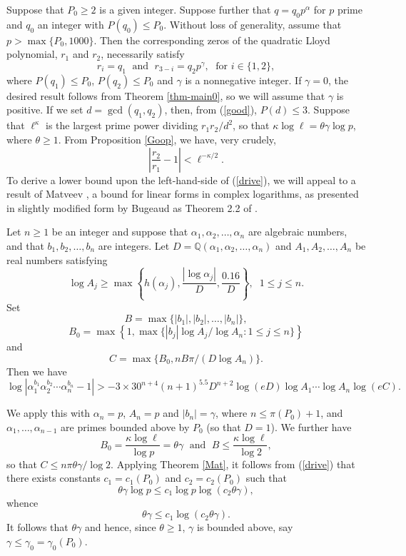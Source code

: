\documentclass{amsart}
\begin{document}
{Suppose that $P_0 \geq 2$ is a given  integer.  Suppose further  that $q=q_0p^\alpha$ for $p$ prime and $q_0$ an integer with $P(q_0) \leq P_0$. Without loss of generality, assume that $p > \max \{ P_0, 1000 \}$. Then the corresponding zeros of the quadratic Lloyd polynomial, $r_1$ and $r_2$, necessarily satisfy
$$
r_i = q_1 \; \mbox{ and } \; r_{3-i} = q_2 p^\gamma, \; \mbox{ for } i \in \{ 1, 2 \},
$$
where $P(q_1) \leq P_0$, $P(q_2) \leq P_0$ and $\gamma$ is a nonnegative integer. If $\gamma=0$, the desired result follows from Theorem \ref{thm-main0}, so  we will assume that $\gamma$ is positive. If we set $d=\gcd (q_1, q_2)$, then, from (\ref{good}), $P(d) \leq 3$.
Suppose that $\ell^\kappa$ is the largest prime power dividing $r_1r_2/d^2$, so that $\kappa \log\ell = \theta \gamma \log p$, where $\theta \geq 1$. From Proposition \ref{Goop}, we have, very crudely,
\begin{equation} \label{drive}
\left| \frac{r_2}{r_{1}} -1 \right|  < \ell^{-\kappa/2}.
\end{equation}
To derive a lower bound upon the left-hand-side of (\ref{drive}), we will appeal to a result of Matveev \cite{Mat}, a bound for linear forms in complex logarithms, as presented in slightly modified form by Bugeaud as Theorem 2.2 of \cite{Bug}.
\begin{thm}[Matveev] \label{Mat} Let $n \geq 1$ be an integer and
suppose that $\alpha_1, \alpha_2, \ldots, \alpha_n$ are algebraic numbers, and that $b_1, b_2, \ldots, b_n$ are integers.
Let $D=\mathbb{Q}(\alpha_1,\alpha_2, \ldots, \alpha_n)$ and $A_1, A_2, \ldots, A_n$ be real numbers satisfying
$$
\log A_j \geq \max \left\{ h(\alpha_j), \frac{|\log \alpha_j|}{D}, \frac{0.16}{D}  \right\}, \; \; 1 \leq j \leq n.
$$
Set
$$
B= \max \{ |b_1|, |b_2|, \ldots, |b_n| \},
$$
$$
B_0=\max \left\{ 1, \max \{ |b_j| \log A_j/\log A_n : 1 \leq j \leq n \} \right\}
$$
and
$$
C= \max \{ B_0, nB \pi/(D \log A_n) \}.
$$
Then we have
$$
\log \left| \alpha_1^{b_1} \alpha_2^{b_2} \cdots \alpha_n^{b_n} -1 \right| > -3 \times 30^{n+4} (n+1)^{5.5} D^{n+2} \log (eD)
\log A_1 \cdots \log A_n \log (eC).
$$
\end{thm}
We apply this with $\alpha_n=p$, $A_n = p$ and $|b_n|=\gamma$, where
$n \leq \pi (P_0)+1$, and $\alpha_1, \ldots, \alpha_{n-1}$ are primes bounded above by $P_0$ (so that $D=1$). We further have
$$
B_0 = \frac{\kappa \log \ell}{\log p} = \theta \gamma
\; \mbox{ and } \; B \leq  \frac{\kappa \log \ell}{\log 2},
$$
so that $C \leq n \pi  \theta \gamma/\log 2$. Applying Theorem \ref{Mat}, it follows from (\ref{drive}) that there exists  constants $c_1=c_1(P_0)$ and  $c_2=c_2(P_0)$ such that 
$$
\theta \gamma \log p \leq c_1 \log p \log (c_2 \theta \gamma),
$$
whence
$$
\theta \gamma  \leq c_1  \log (c_2 \theta \gamma).
$$
It follows that $\theta \gamma$ and hence, since $\theta \geq 1$, $\gamma$ is bounded above, say $\gamma \leq \gamma_0 = \gamma_0 (P_0)$.

}
\end{document}
